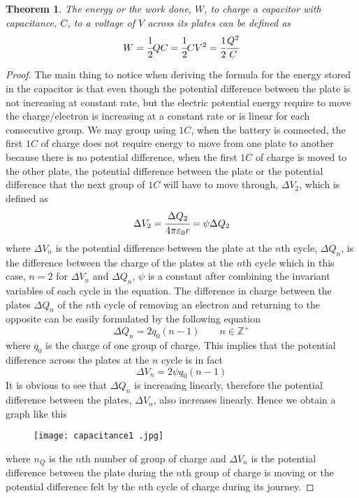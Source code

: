 \documentclass{article}
\newtheorem{theorem}{Theorem}[subsection]
\begin{document}
\begin{theorem}
The energy or the work done, $W$, to charge a capacitor with capacitance, $C$, to a voltage of $V$ across its plates can be defined as 
$$W=\cfrac{1}{2}QC=\cfrac{1}{2}CV^2=\cfrac{1}{2}\cfrac{Q^2}{C}$$
\end{theorem}

\begin{proof}
The main thing to notice when deriving the formula for the energy stored in the capacitor is that even though the potential difference between the plate is not increasing at constant rate, but the electric potential energy require to move the charge/electron is increasing at a constant rate or is linear for each consecutive group. We may group using $1C$, when the battery is connected, the first $1C$ of charge does not require energy to move from one plate to another because there is no potential difference, when the first $1C$ of charge is moved to the other plate, the potential difference between the plate or the potential difference that the next group of $1C$ will have to move through, $\Delta V_2$, which is defined as
$$\Delta V_2=\cfrac{\Delta Q_2}{4\pi\varepsilon_0r}=\psi\Delta Q_2$$
where $\Delta V_n$ is the potential difference between the plate at the $n$th cycle, $\Delta Q_n$, is the difference between the charge of the plates at the $n$th cycle which in this case, $n=2$ for $\Delta V_n$ and $\Delta Q_n$, $\psi$ is a constant after combining the invariant variables of each cycle in the equation. The difference in charge between the plates $\Delta Q_n$ of the $n$th cycle of removing an electron and returning to the opposite can be easily formulated by the following equation
$$\Delta Q_n=2q_0(n-1) \quad \quad n\in \mathbb{Z}^+$$
where $q_0$ is the charge of one group of charge. This implies that the potential difference across the plates at the $n$ cycle is in fact 
\begin{equation}
    \Delta V_n= 2 \psi q_0 (n-1) 
\end{equation}
It is obvious to see that $\Delta Q_n$ is increasing linearly, therefore the potential difference between the plates, $\Delta V_n$, also increases linearly. Hence we obtain a graph like this 
\begin{figure}[H]
    \centering
    \texttt{[image: capacitance1 .jpg]}
\end{figure}
where $n_Q$ is the $n$th number of group of charge and $\Delta V_n$ is the potential difference between the plate during the $n$th group of charge is moving or the potential difference felt by the $n$th cycle of charge during its journey.


\end{proof}
\end{document}
